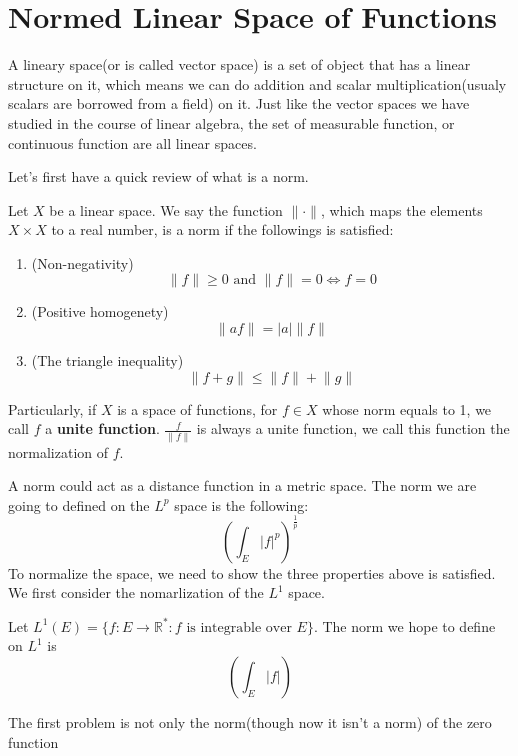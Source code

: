 \documentclass[lang=en, 12pt]{elegantbook}
\newcommand{\RR}{\mathbb{R}}
\begin{document}
    \section{Normed Linear Space of Functions}
        A lineary space(or is called vector space)
    is a set of object that has a linear structure on it, which
    means we can do addition and scalar multiplication(usualy scalars are borrowed 
    from a field) on it. Just like the vector spaces we have 
    studied in the course of linear algebra, the set of measurable function, or continuous 
    function are all linear spaces. 
 
    Let's first have a quick review of what is a norm.
        \begin{definition}[Norm]
            Let $X$ be a linear space. We say the function $\lVert \cdot\rVert$, 
        which maps the elements $X \times X$ to a real number, is a norm if the 
        followings is satisfied:
            \begin{enumerate}
                \item (Non-negativity)
                $$\lVert f \rVert \geq 0 \mbox{ and } \lVert f \rVert = 0 \Leftrightarrow f = 0$$
                \item (Positive homogenety)
                $$\lVert af \rVert = |a|\lVert f\rVert$$
                \item (The triangle inequality)
                $$\lVert f+g\rVert \leq \lVert f\rVert+\lVert g\rVert$$
            \end{enumerate}
            Particularly, if $X$ is a space of functions, for $f \in X$ whose norm
        equals to 1, we call $f$ a \textbf{unite function}. $\frac{f}{\lVert f \rVert}$
        is always a unite function, we call this function the normalization of $f$.
        \end{definition}
        A norm could act as a distance function in a metric space.
    The norm we are going to defined on the $L^p$ space is the following:
    $$\left(\int_E |f|^p\right)^{\frac{1}{p}}$$
    To normalize the space, we need to show the three properties above
    is satisfied. We first consider the nomarlization of the $L^1$ space.
        \begin{definition}
            Let $L^1(E) = \{f:E \to \RR^*: f \mbox{ is integrable over }E \}$.
        The norm we hope to define on $L^1$ is 
        $$\left(\int_E |f|\right)$$
        \end{definition} 
        The first problem is not only the norm(though now it isn't a norm) of the zero function\
\end{document}
